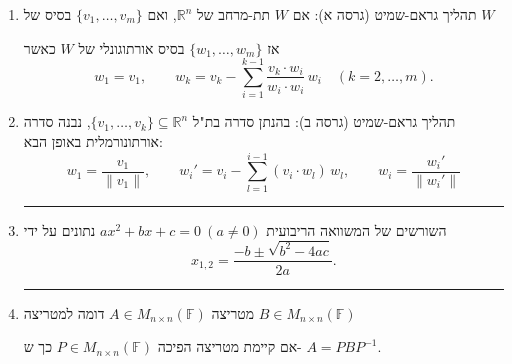 \documentclass[12pt, a4paper]{article}
\newcommand{\ff}{\mathbb{F}}
\newcommand{\rr}{\mathbb{R}}
\begin{document}
\begin{enumerate}
\item תהליך גראם-שמיט (גרסה א):
אם $W$ תת-מרחב של $\rr^n$, ואם $\{v_1,\ldots,v_m\}$ בסיס של $W$

אז $\{w_1,\ldots,w_m\}$ בסיס אורתוגונלי של $W$ כאשר
\[
w_1=v_1,\qquad
w_k=v_k-\sum_{i=1}^{k-1}\frac{ v_k\cdot w_i}{ w_i\cdot w_i}\,w_i
\quad (k=2,\ldots,m).
\]
\item תהליך גראם-שמיט (גרסה ב):
בהנתן סדרה בת"ל
$\{v_1,\ldots,v_k\}\subseteq \rr^n$, נבנה סדרה אורתונורמלית באופן הבא:
\[
w_1=\frac{v_1}{\|v_1\|},\qquad
w_i'=v_i-\sum_{l=1}^{i-1} (v_i\cdot w_l)\,w_l,\qquad w_i = \frac{w_i'}{\|w_i'\|}
\]

\noindent\rule{\textwidth-30pt}{0.4pt}

\item השורשים של המשוואה הריבועית
$
ax^2+bx+c=0\ (a\neq 0)
$
נתונים על ידי
\[
x_{1,2}=\frac{-b\pm\sqrt{b^2-4ac}}{2a}.
\]

\noindent\rule{\textwidth-30pt}{0.4pt}

\item מטריצה $A\in M_{n\times n}(\ff)$ דומה למטריצה $B\in M_{n\times n}(\ff)$ 

אם
קיימת 
מטריצה הפיכה
$P\in M_{n\times n}(\ff)$ כך ש-
$A=PBP^{-1}$.
\end{enumerate}
\end{document}
